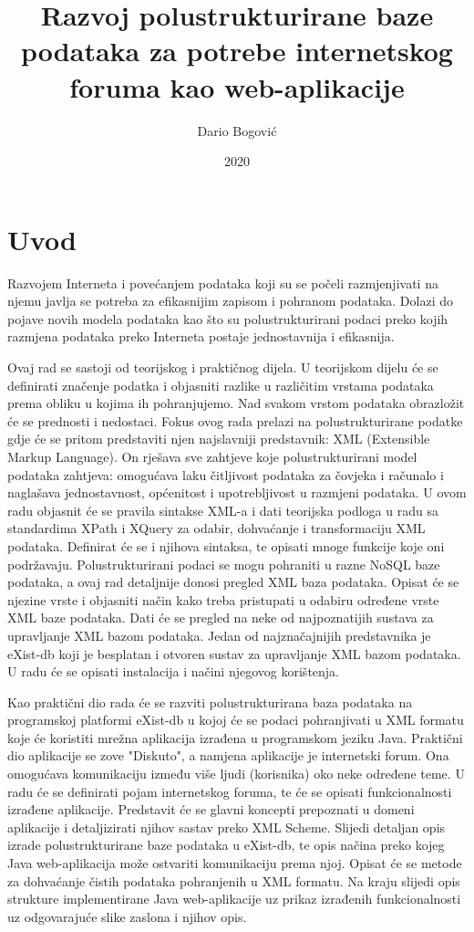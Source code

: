 \documentclass{foi}
\title{Razvoj polustrukturirane baze podataka za potrebe internetskog foruma kao web-aplikacije}
\author{Dario Bogović}
\date{2020}
\begin{document}
\maketitle

\tableofcontents

\pagestyle{plain}
\chapter{Uvod}

Razvojem Interneta i povećanjem podataka koji su se počeli razmjenjivati na njemu javlja se potreba za efikasnijim zapisom i pohranom podataka. Dolazi do pojave novih modela podataka kao što su polustrukturirani podaci preko kojih razmjena podataka preko Interneta postaje jednostavnija i efikasnija.

Ovaj rad se sastoji od teorijskog i praktičnog dijela. U teorijskom dijelu će se definirati značenje podatka i objasniti razlike u različitim vrstama podataka prema obliku u kojima ih pohranjujemo. Nad svakom vrstom podataka obrazložit će se prednosti i nedostaci. Fokus ovog rada prelazi na polustrukturirane podatke gdje će se pritom predstaviti njen najslavniji predstavnik: XML (Extensible Markup Language). On rješava sve zahtjeve koje polustrukturirani model podataka zahtjeva: omogućava laku čitljivost podataka za čovjeka i računalo i naglašava jednostavnost, općenitost i upotrebljivost u razmjeni podataka. U ovom radu objasnit će se pravila sintakse XML-a i dati teorijska podloga u radu sa standardima XPath i XQuery za odabir, dohvaćanje i transformaciju XML podataka. Definirat će se i njihova sintaksa, te opisati mnoge funkcije koje oni podržavaju. Polustrukturirani podaci se mogu pohraniti u razne NoSQL baze podataka, a ovaj rad detaljnije donosi pregled XML baza podataka. Opisat će se njezine vrste i objasniti način kako treba pristupati u odabiru određene vrste XML baze podataka. Dati će se pregled na neke od najpoznatijih sustava za upravljanje XML bazom podataka. Jedan od najznačajnijih predstavnika je eXist-db koji je besplatan i otvoren sustav za upravljanje XML bazom podataka. U radu će se opisati instalacija i načini njegovog korištenja.

Kao praktični dio rada će se razviti polustrukturirana baza podataka na programskoj platformi eXist-db u kojoj će se podaci pohranjivati u XML formatu koje će koristiti mrežna aplikacija izrađena u programskom jeziku Java. Praktični dio aplikacije se zove "Diskuto", a namjena aplikacije je internetski forum. Ona omogućava komunikaciju između više ljudi (korisnika) oko neke određene teme. U radu će se definirati pojam internetskog foruma, te će se opisati funkcionalnosti izrađene aplikacije. Predstavit će se glavni koncepti prepoznati u domeni aplikacije i detaljizirati njihov sastav preko XML Scheme. Slijedi detaljan opis izrade polustrukturirane baze podataka u eXist-db, te opis načina preko kojeg Java web-aplikacija može ostvariti komunikaciju prema njoj. Opisat će se metode za dohvaćanje čistih podataka pohranjenih u XML formatu. Na kraju slijedi opis strukture implementirane Java web-aplikacije uz prikaz izrađenih funkcionalnosti uz odgovarajuće slike zaslona i njihov opis.
\end{document}
